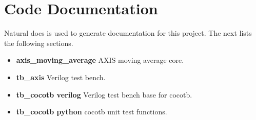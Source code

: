 \section{Code Documentation} \label{Code Documentation}

\par
Natural docs is used to generate documentation for this project. The next lists the following sections.

\begin{itemize}
\item \textbf{axis\_moving\_average} AXIS moving average core.\\
\item \textbf{tb\_axis} Verilog test bench.\\
\item \textbf{tb\_cocotb verilog} Verilog test bench base for cocotb.\\
\item \textbf{tb\_cocotb python} cocotb unit test functions.\\
\end{itemize}

